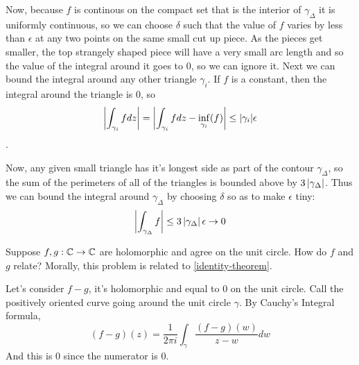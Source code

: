 \documentclass{homework}
\begin{document}
\begin{solution}
                                                                                                Now, because $f$ is continous on the compact set that is the interior of $\gamma_{\Delta}$ it is uniformly continuous, so we can choose $\delta$ such that the value of $f$ varies by less than $\epsilon$ at any two points on the same small cut up piece. As the pieces get smaller, the top strangely shaped piece will have a very small arc length and so the value of the integral around it goes to 0, so we can ignore it. Next we can bound the integral around any other triangle $\gamma_{i}$. If $f$ is a constant, then the integral around the triangle is 0, so
                                                                                                \[\left|\int_{\gamma_i} f dz\right| = \left|\int_{\gamma_i} f dz- \inf_{\gamma_i}(f)\right| \leq |\gamma_i|\epsilon\].

                                                                                                Now, any given small triangle has it's longest side as part of the contour $\gamma_{\Delta}$, so the sum of the perimeters of all of the triangles is bounded above by $3\left|\gamma_{\Delta}\right|$. Thus we can bound the integral around $\gamma_\Delta$ by choosing $\delta$ so as to make $\epsilon$ tiny:
                                                                                                \[\left|\int_{\gamma_\Delta} f\right|\leq 3\left|\gamma_{\Delta}\right|\epsilon\to 0\]
                                                                                                \end{solution}

                                                                                                \begin{problem}
                                                                                                  Suppose $f, g : \mathbb{C} \to \mathbb{C}$ are holomorphic and agree on the unit
                                                                                                    circle.  How do $f$ and $g$ relate?  Morally, this problem is
                                                                                                      related to \ref{identity-theorem}.
                                                                                                      \end{problem}
                                                                                                      \begin{solution}
                                                                                                      Let's consider $f-g$, it's holomorphic and equal to 0 on the unit circle. Call the positively oriented curve going around the unit circle $\gamma$. By Cauchy's Integral formula, 
                                                                                                      \[(f-g)(z) = \frac{1}{2\pi i}\int_{\gamma}\frac{(f-g)(w)}{z-w}dw\]
                                                                                                      And this is $0$ since the numerator is $0$.
                                                                                                      \end{solution}
\end{document}
